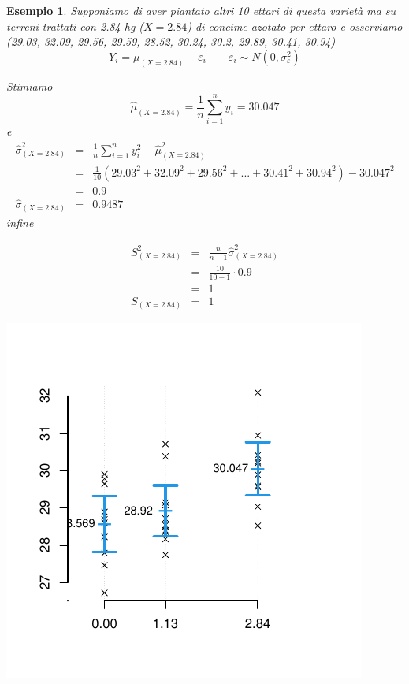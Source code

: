 \documentclass[
  11pt,
]{book}
\theoremstyle{mytheoremstyle}
\theoremstyle{mydefstyle}
\newtheorem{example}{{Esempio}}[section]
\begin{document}
\begin{example}

Supponiamo di aver piantato altri 10 ettari di questa varietà ma su terreni trattati con 2.84 hg (\(X=2.84\))
di concime azotato per ettaro e osserviamo (29.03, 32.09, 29.56, 29.59, 28.52, 30.24, 30.2, 29.89, 30.41, 30.94)
\[Y_i=\mu_{(X=2.84)}+\varepsilon_i\qquad\varepsilon_i\sim N(0,\sigma_\varepsilon^2)\]

Stimiamo
\[\hat\mu_{(X=2.84)}=\frac 1 n\sum_{i=1}^n y_i=30.047\]
e
\begin{eqnarray*}
\hat\sigma_{(X=2.84)}^2&=&\frac 1 n\sum_{i=1}^n y_i^2-\hat\mu_{(X=2.84)}^2\\
&=&\frac 1 {10}(29.03^2+32.09^2+29.56^2 +...+ 30.41^2+30.94^2)-30.047^2\\
&=&0.9\\
\hat\sigma_{(X=2.84)} &=& 0.9487
\end{eqnarray*}
infine

\begin{eqnarray*}
S_{(X=2.84)}^2&=&\frac{n}{n-1}\hat\sigma_{(X=2.84)}^2\\
&=&\frac{10}{10-1}\cdot0.9\\
&=&1\\
S_{(X=2.84)}&=&1
\end{eqnarray*}

\begin{center}\includegraphics{Appunti_di_Statistica_2025_files/figure-latex/17-regressione-I-12-1} \end{center}


\end{example}
\end{document}
